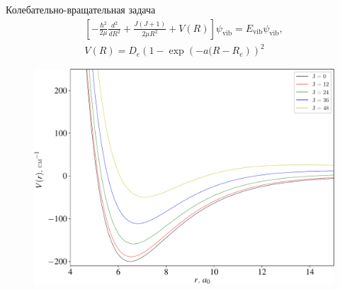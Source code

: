 \documentclass[10pt,pdf,hyperref={unicode},xcolor=dvipsnames]{beamer}
\newcommand{\lb}{\left(}
\newcommand{\rb}{\right)}
\newcommand{\lsq}{\left[}
\newcommand{\rsq}{\right]}
\begin{document}
\begin{frame}{Колебательно-вращательная задача}
    \vspace*{-0.5cm}
    \begin{gather}
        \lsq -\frac{\hbar^2}{2 \mu} \frac{d^2}{dR^2} + \frac{J(J+1)}{2 \mu R^2} + V(R) \rsq \psi_\text{vib} = E_\text{vib} \psi_\text{vib}, \\
        V(R) = D_e \lb 1 - \exp \lb -a(R - R_e \rb \rb^2 
    \end{gather}
    \vspace*{-0.5cm}
    \begin{figure}[H]
        \includegraphics[width=0.7\linewidth]{./pictures/potential_profiles-crop.pdf}
    \end{figure}
\end{frame}
\end{document}
